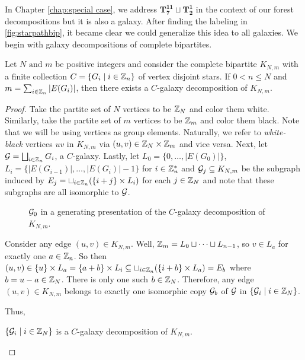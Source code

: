 In Chapter \ref{chap:special case}, we address $\mathbf{T_{7}^{11}}\sqcup\mathbf{T_{2}^{1}}$ in the context of our forest decompositions but it is also a galaxy. After finding the labeling in \ref{fig:starpathbip}, it became clear we could generalize this idea to all galaxies. We begin with galaxy decompositions of complete bipartites.

\begin{thm}\label{thm:galdecomp}
Let $N\text{ and }m$ be positive integers and consider the complete bipartite $K_{N,m}$ with a finite collection $C=\{G_{i}\mid i\in \mathbb{Z}_{n}\}$ of vertex disjoint stars. If $0<n\leq N$ and $m=\sum_{i\in \mathbb{Z}_{n}}|E(G_{i})|$, then there exists a $C$-galaxy decomposition of $K_{N,m}$.
\end{thm}
\begin{proof}
  Take the partite set of $N$ vertices to be $\mathbb{Z}_{N}$ and color them white. Similarly, take the partite set of $m$ vertices to be $\mathbb{Z}_{m}$ and color them black. Note that we will be using vertices as group elements. Naturally, we refer to \textit{white-black} vertices $uv$ in $K_{N,m}$ via $(u,v)\in \mathbb{Z}_{N}\times \mathbb{Z}_{m}$ and vice versa. Next, let $\mathcal{G}=\bigsqcup_{i\in \mathbb{Z}_{n}}G_{i}$, a $C$-galaxy. Lastly, let $L_{0}=\{0,\hdots,|E(G_{0})|\}$, $L_{i}=\{|E(G_{i-1})|,\hdots,|E(G_{i})|-1\}$ for $i\in \mathbb{Z}^{*}_{n}$ and $\mathcal{G}_{j}\subseteq K_{N,m}$ be the subgraph induced by $E_{j}=\sqcup_{i\in \mathbb{Z}_{n}} (\{i+j\}\times L_{i})$ for each $j\in \mathbb{Z}_{N}$ and note that these subgraphs are all isomorphic to $\mathcal{G}$.
\begin{figure}[H]
    \centering
    
    \caption{$\mathcal{G}_{0}$ in a generating presentation of the $C$-galaxy decomposition of $K_{N,m}$.}
    \label{fig:galdecomp}
\end{figure}
\noindent Consider any edge $(u,v)\in K_{N,m}$. Well, $\mathbb{Z}_{m}=L_{0}\sqcup \cdots \sqcup L_{n-1}$, so $v\in L_{a}$ for exactly one $a\in \mathbb{Z}_{n}$. So then $(u,v)\in \{u\}\times L_{a}=\{a+b\}\times L_{i}\subseteq \sqcup_{i\in \mathbb{Z}_{n}} (\{i+b\}\times L_{a})=E_{b}$ where $b=u-a\in \mathbb{Z}_{N}$. There is only one such $b\in \mathbb{Z}_{N}$. Therefore, any edge $(u,v)\in K_{N,m}$ belongs to exactly one isomorphic copy $\mathcal{G}_{b}$ of $\mathcal{G}$ in $\{\mathcal{G}_{i}\mid i\in \mathbb{Z}_{N}\}$.\newline

Thus,
\begin{center}
$\{\mathcal{G}_{i}\mid i\in \mathbb{Z}_{N}\}$ is a $C$-galaxy decomposition of $K_{N,m}$.
\end{center}
  
\end{proof}
